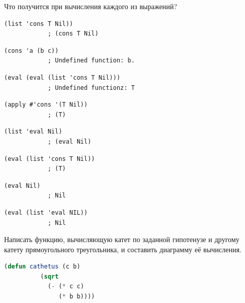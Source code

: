 \documentclass[a4paper,oneside,12pt]{extreport}
\begin{document}
\begin{task}
	Что получится при вычисления каждого из выражений?
	\begin{AutoMultiColEnumerate}
		\item \begin{lstlisting}[style=lispinline, gobble=24]
			(list 'cons T Nil))
			; (cons T Nil)
		\end{lstlisting}

		\item \begin{lstlisting}[style=lispinline, gobble=24]
			(cons 'a (b c))
			; Undefined function: b.
		\end{lstlisting}

		\item \begin{lstlisting}[style=lispinline, gobble=24]
			(eval (eval (list 'cons T Nil)))
			; Undefined functionz: T
		\end{lstlisting}

		\item \begin{lstlisting}[style=lispinline, gobble=24]
			(apply #'cons '(T Nil))	
			; (T)
		\end{lstlisting}

		\item \begin{lstlisting}[style=lispinline, gobble=24]
			(list 'eval Nil)
			; (eval Nil)
		\end{lstlisting}

		\item \begin{lstlisting}[style=lispinline, gobble=24]
			(eval (list 'cons T Nil))
			; (T)
		\end{lstlisting}

		\item \begin{lstlisting}[style=lispinline, gobble=24]
			(eval Nil)
			; Nil
		\end{lstlisting}

		\item \begin{lstlisting}[style=lispinline, gobble=24]
			(eval (list 'eval NIL))
			; Nil
		\end{lstlisting}
	\end{AutoMultiColEnumerate}
\end{task}

\begin{task}
	Написать функцию, вычисляющую катет по заданной гипотенузе и другому катету прямоугольного треугольника, и составить диаграмму её вычисления.

	\begin{lstlisting}[language=Lisp, gobble=16]
		(defun cathetus (c b)
		  (sqrt
		    (- (* c c)
		       (* b b))))
	\end{lstlisting}
\end{task}
\end{document}
